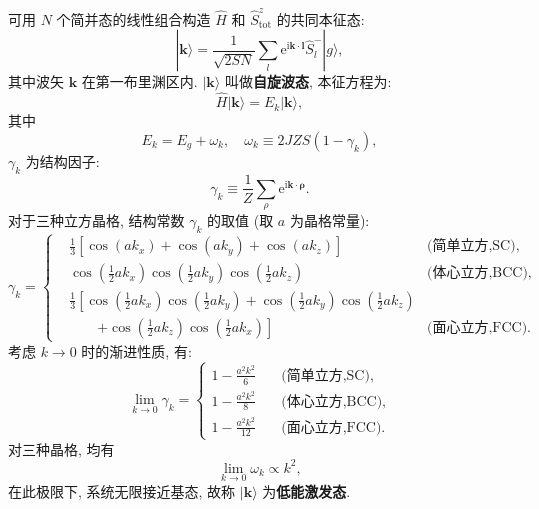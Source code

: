 可用 $N$ 个简并态的线性组合构造 $\hat{H}$ 和 $\hat{S}_{\text{tot}}^{z}$ 的共同本征态:
\begin{equation}
|\boldsymbol{k}\rangle=\frac{1}{\sqrt{2 S N}} \sum_{l} \mathrm{e}^{\mathrm{i} \boldsymbol{k} \cdot \boldsymbol{l}} \hat{S}_{l}^{-}|g\rangle,
\end{equation}
其中波矢 $\boldsymbol{k}$ 在第一布里渊区内. $|\boldsymbol{k}\rangle$ 叫做\textbf{自旋波态}, 本征方程为:
\begin{equation}
\hat{H}|\boldsymbol k \rangle=E_{k}|\boldsymbol{k}\rangle,
\end{equation}
其中
\begin{equation}\label{2821}
E_{k}=E_{g}+\omega_{k},\quad\omega_{k} \equiv 2 J Z S\left(1-\gamma_{k}\right),
\end{equation}
$\gamma_{k}$ 为结构因子: 
\begin{equation}
\gamma_{k} \equiv \frac{1}{Z} \sum_{\rho} \mathrm{e}^{\mathrm{i} \boldsymbol{k} \cdot \boldsymbol{\rho}}.
\end{equation}
对于三种立方晶格, 结构常数 $\gamma_{k}$ 的取值 (取 $a$ 为晶格常量):
\begin{equation}
\gamma_{k}= \left\{\begin{aligned}
&\displaystyle\frac{1}{3}\left[\cos \left(a k_{x}\right)+\cos \left(a k_{y}\right)+\cos\left( a k_{z}\right)\right] & \text {(简单立方,SC)}, \\ 
&\displaystyle\cos \left(\frac{1}{2} a k_{x}\right) \cos \left(\frac{1}{2} a k_{y}\right) \cos \left(\frac{1}{2} a k_{z}\right) & \text {(体心立方,BCC)}, \\ 
&\displaystyle\frac{1}{3}\left[\cos\left( \frac{1}{2} a k_{x}\right) \cos\left( \frac{1}{2} a k_{y}\right)+\cos \left(\frac{1}{2} a k_{y}\right) \cos \left(\frac{1}{2} a k_{z}\right)\right. &\\
&\displaystyle\qquad\left. +\cos \left(\frac{1}{2} a k_{z} \right)\cos \left(\frac{1}{2} a k_{x}\right)\right] & \text {(面心立方,FCC)}.\end{aligned}\right.
\end{equation}
考虑 $k \rightarrow 0$ 时的渐进性质, 有:
\begin{equation}
\lim_{k\to 0}\gamma_{k}= \left\{\begin{aligned}
\displaystyle 1-\frac{a^2 k^2}{6} \quad& \text {(简单立方,SC)}, \\ 
\displaystyle 1-\frac{a^2 k^2}{8}\quad& \text {(体心立方,BCC)}, \\ 
\displaystyle 1-\frac{a^2 k^2}{12}\quad& \text {(面心立方,FCC)}.\end{aligned}\right.
\end{equation}
对三种晶格, 均有
\begin{equation}
\lim _{k \rightarrow 0} \omega_{k} \propto k^{2} ,
\end{equation}
在此极限下, 系统无限接近基态, 故称 $|\boldsymbol{k}\rangle$ 为\textbf{低能激发态}.

